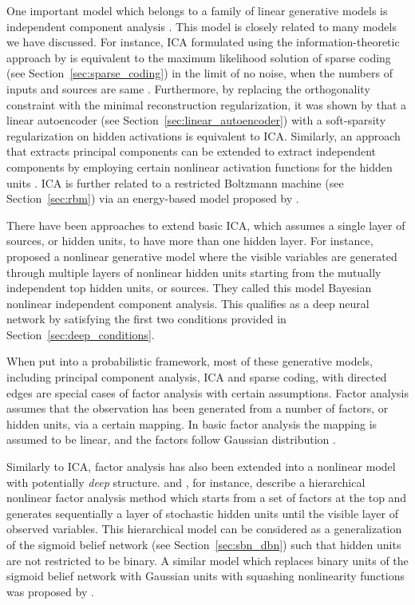\documentclass[dissertation,nocontribution,draft*]{aaltoseries}
\begin{document}
One important model which belongs to a family of linear
generative models is independent component analysis
\citep[ICA, see, e.g.,][and references
therein]{Hyvarinen2001}. This model is closely related to
many models we have discussed.  For instance, ICA formulated
using the information-theoretic approach by \citet{Bell1995}
is equivalent to the maximum likelihood solution of sparse
coding (see Section~\ref{sec:sparse_coding}) in the limit of
no noise, when the numbers of inputs and
sources are same \citep{Olshausen1997}.  Furthermore, by
replacing the orthogonality constraint with the minimal
reconstruction regularization, it was shown by
\citet{Le2011} that a linear autoencoder (see
Section~\ref{sec:linear_autoencoder}) with a
soft-sparsity regularization on hidden activations is
equivalent to ICA. Similarly, an approach that extracts
principal components can be extended to extract independent
components by employing certain nonlinear
activation functions for the hidden units \citep[see,
e.g.,][]{Oja1997,Hyvarinen2001}. ICA is further related
to a restricted Boltzmann machine (see
Section~\ref{sec:rbm}) via an energy-based model proposed by
\citet{Teh2003}.

There have been approaches to extend basic ICA, which
assumes a single layer of sources, or hidden units, to have
more than one hidden layer. For instance,
\citet{Lappalainen2000} proposed a nonlinear generative
model where the visible variables are generated through
multiple layers of nonlinear hidden units starting from the
mutually independent top hidden units, or sources. They
called this model Bayesian nonlinear independent component
analysis. This qualifies as a deep neural network by
satisfying the first two conditions provided in
Section~\ref{sec:deep_conditions}.

When put into a probabilistic framework, most of these
generative models, including principal component analysis,
ICA and sparse coding, with directed edges are special cases
of factor analysis with certain assumptions. Factor analysis
assumes that the observation has been generated from a
number of factors, or hidden units, via a certain mapping.
In basic factor analysis the mapping is
assumed to be linear, and the factors follow Gaussian
distribution \citep[see, e.g.,][and references
therein]{Bishop2006}. 

Similarly to ICA, factor analysis has also been extended
into a nonlinear model with potentially \textit{deep}
structure. \citet{Raiko2001} and \citet{Raiko2007}, for instance,
describe a hierarchical nonlinear factor analysis method which
starts from a set of factors at the top and generates
sequentially a layer of stochastic hidden units until the
visible layer of observed variables. This hierarchical model
can be considered as a generalization of the sigmoid belief
network (see Section~\ref{sec:sbn_dbn}) such that hidden
units are not restricted to be binary. A similar model which
replaces binary units of the sigmoid belief network with
Gaussian units with squashing nonlinearity functions 
was proposed by \citet{Frey1999}.
\end{document}
